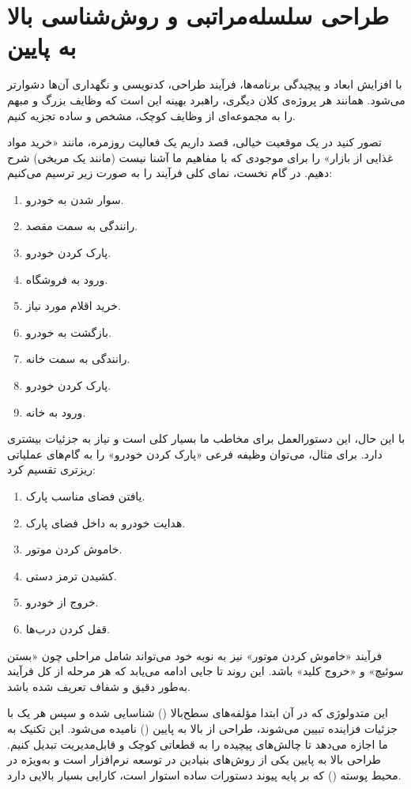 \chapter{طراحی سلسله‌مراتبی و روش‌شناسی بالا به پایین}

با افزایش ابعاد و پیچیدگی برنامه‌ها، فرآیند طراحی، کدنویسی و نگهداری آن‌ها دشوارتر می‌شود. همانند هر پروژه‌ی کلان دیگری، راهبرد بهینه این است که وظایف بزرگ و مبهم را به مجموعه‌ای از وظایف کوچک، مشخص و ساده تجزیه کنیم.

تصور کنید در یک موقعیت خیالی، قصد داریم یک فعالیت روزمره، مانند «خرید مواد غذایی از بازار» را برای موجودی که با مفاهیم ما آشنا نیست (مانند یک مریخی) شرح دهیم. در گام نخست، نمای کلی فرآیند را به صورت زیر ترسیم می‌کنیم:

\begin{enumerate}
  \item سوار شدن به خودرو.
  \item رانندگی به سمت مقصد.
  \item پارک کردن خودرو.
  \item ورود به فروشگاه.
  \item خرید اقلام مورد نیاز.
  \item بازگشت به خودرو.
  \item رانندگی به سمت خانه.
  \item پارک کردن خودرو.
  \item ورود به خانه.
\end{enumerate}

با این حال، این دستورالعمل برای مخاطب ما بسیار کلی است و نیاز به جزئیات بیشتری دارد. برای مثال، می‌توان وظیفه فرعی «پارک کردن خودرو» را به گام‌های عملیاتی ریزتری تقسیم کرد:

\begin{enumerate}
  \item یافتن فضای مناسب پارک.
  \item هدایت خودرو به داخل فضای پارک.
  \item خاموش کردن موتور.
  \item کشیدن ترمز دستی.
  \item خروج از خودرو.
  \item قفل کردن درب‌ها.
\end{enumerate}

فرآیند «خاموش کردن موتور» نیز به نوبه خود می‌تواند شامل مراحلی چون «بستن سوئیچ» و «خروج کلید» باشد. این روند تا جایی ادامه می‌یابد که هر مرحله از کل فرآیند به‌طور دقیق و شفاف تعریف شده باشد.

این متدولوژی که در آن ابتدا مؤلفه‌های سطح‌بالا () شناسایی شده و سپس هر یک با جزئیات فزاینده تبیین می‌شوند، طراحی از بالا به پایین () نامیده می‌شود. این تکنیک به ما اجازه می‌دهد تا چالش‌های پیچیده را به قطعاتی کوچک و قابل‌مدیریت تبدیل کنیم. طراحی بالا به پایین یکی از روش‌های بنیادین در توسعه نرم‌افزار است و به‌ویژه در محیط پوسته () که بر پایه پیوند دستورات ساده استوار است، کارایی بسیار بالایی دارد.

